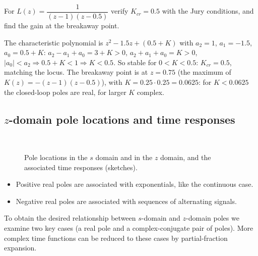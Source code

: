 \begin{problem}
For $L(z)=\dfrac{1}{(z-1)(z-0.5)}$ verify $K_{cr}=0.5$ with the Jury conditions, and find the gain at the
breakaway point.
\end{problem}
\begin{solution}
The characteristic polynomial is $z^{2}-1.5z+(0.5+K)$ with $a_2=1$, $a_1=-1.5$, $a_0=0.5+K$:
$a_2-a_1+a_0=3+K>0$, $a_2+a_1+a_0=K>0$, $|a_0|<a_2\Rightarrow0.5+K<1\Rightarrow K<0.5$. So stable for
$0<K<0.5$: $K_{cr}=0.5$, matching the locus. The breakaway point is at $z=0.75$ (the maximum of
$K(z)=-(z-1)(z-0.5)$), with $K=0.25\cdot0.25=0.0625$: for $K<0.0625$ the closed-loop poles are real, for larger
$K$ complex.
\end{solution}

\subsection{$z$-domain pole locations and time responses}
\begin{figure}[H]
\centering
\resizebox{0.95\linewidth}{!}{\figSpoles}\\[2mm]
\resizebox{0.95\linewidth}{!}{\figZpoles}
\caption{Pole locations in the $s$ domain and in the $z$ domain, and the associated time responses
(sketches).}
\end{figure}

\begin{itemize}
  \item Positive real poles are associated with exponentials, like the continuous case.
  \item Negative real poles are associated with sequences of alternating signals.
\end{itemize}
To obtain the desired relationship between $s$-domain and $z$-domain poles we examine two key cases (a real pole
and a complex-conjugate pair of poles). More complex time functions can be reduced to these cases by
partial-fraction expansion.

